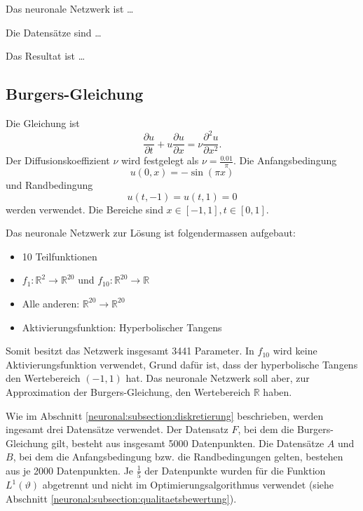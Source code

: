 Das neuronale Netzwerk ist \ldots

Die Datensätze sind \ldots

Das Resultat ist \ldots


\subsection{Burgers-Gleichung}\label{neuronal:subsection:burgers_gleichung}
Die Gleichung ist
\begin{equation}
    \frac{\partial u}{\partial t} + u \frac{\partial u}{\partial x} = \nu \frac{\partial^2 u}{\partial x^2}.
    \label{neuronal:burgers}
\end{equation}
Der Diffusionskoeffizient $\nu$ wird festgelegt als $\nu = \frac{0.01}{\pi}$.
Die Anfangsbedingung
\begin{equation}
    u(0, x) = - \sin(\pi x)
    \label{neuronal:burgers_anfang}
\end{equation}
und Randbedingung
\begin{equation}
    u(t, -1) = u(t, 1) = 0
    \label{neuronal:burgers_rand}
\end{equation}
werden verwendet.
Die Bereiche sind \( x \in [-1,1], t \in [0,1] \).

Das neuronale Netzwerk zur Lösung ist folgendermassen aufgebaut:
\begin{itemize}
    \item 10 Teilfunktionen
    \item $f_1: \mathbb{R}^2 \longrightarrow \mathbb{R}^{20}$ und $f_{10}: \mathbb{R}^{20} \longrightarrow \mathbb{R}$
    \item Alle anderen: $\mathbb{R}^{20} \longrightarrow \mathbb{R}^{20}$
    \item Aktivierungsfunktion: Hyperbolischer Tangens
\end{itemize}
Somit besitzt das Netzwerk insgesamt 3441 Parameter.
In $f_{10}$ wird keine Aktivierungsfunktion verwendet, Grund dafür ist, dass der hyperbolische Tangens den Wertebereich $(-1,1)$ hat.
Das neuronale Netzwerk soll aber, zur Approximation der Burgers-Gleichung, den Wertebereich $\mathbb{R}$ haben.

Wie im Abschnitt \ref{neuronal:subsection:diskretierung} beschrieben, werden ingesamt drei Datensätze verwendet.
Der Datensatz $F$, bei dem die Burgers-Gleichung gilt, besteht aus insgesamt 5000 Datenpunkten.
Die Datensätze $A$ und $B$, bei dem die Anfangsbedingung bzw. die Randbedingungen gelten, bestehen aus je 2000 Datenpunkten.
Je $\frac{1}{5}$ der Datenpunkte wurden für die Funktion $L^1(\vartheta)$ abgetrennt und nicht im Optimierungsalgorithmus verwendet (siehe Abschnitt \ref{neuronal:subsection:qualitaetsbewertung}).

